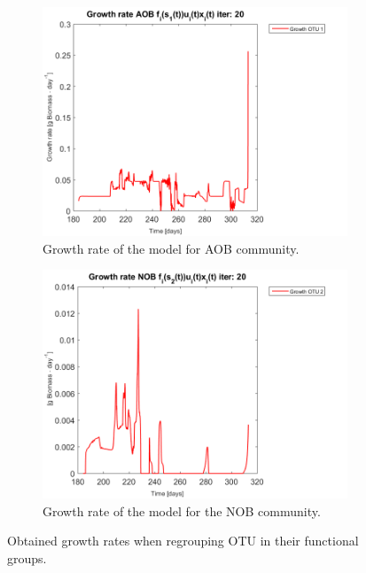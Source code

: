 \documentclass[3p,times]{article}
\begin{document}
\begin{figure}[h]
	\centering
	\begin{subfigure}{0.45 \linewidth}
		\includegraphics[width=\linewidth]{Application/200407_regroup_OTU_try2_iter_20_growth_control_AOB_plot_1}
		\caption{Growth rate of the model for AOB community.}
		\label{AOB_growth_control_application}
	\end{subfigure}
	\begin{subfigure}{0.45 \linewidth}
		\centering
		\includegraphics[width=\linewidth]{Application/200407_regroup_OTU_try2_iter_20_growth_control_NOB_plot_1}
		\caption{Growth rate of the model for the NOB community.}
		\label{NOB_growth_control_application}
	\end{subfigure}
	\caption{Obtained growth rates when regrouping OTU in their functional groups.}
	\label{growth_application}
\end{figure}
\end{document}
